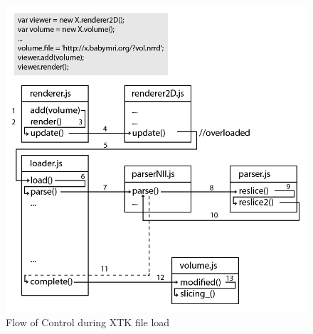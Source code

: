 \documentclass[a4paper,11pt,twoside]{article}
\begin{document}
\begin{figure}[ht!]
\centering
\includegraphics[width=140mm]{graphics/XtkFileLoad_01.png}
\caption{Flow of Control during XTK file load}
\label{fig:xtkLoad}
\end{figure}
\end{document}
